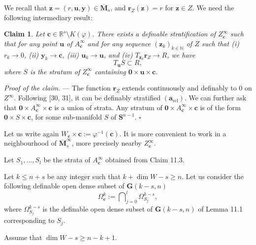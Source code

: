 \documentclass[11pt]{article}
\newtheorem{claim}{Claim}
\begin{document}
We recall that $\mathbf z = (r,\mathbf u,\mathbf y)\in\overline{\mathbf M}_s$, and
$\mathbf r_Z(\mathbf z) = r$ for $\mathbf z\in Z$. We need the following intermediary result:

\begin{claim}
Let $\mathbf c\in\mathbb{R}^s\setminus K(\varphi)$. There exists a definable stratification of
$Z_{\mathbf c}^{\infty}$ such that for any point $\mathbf u$ of $A_{\mathbf c}^{\infty}$ and for any
sequence $(\mathbf z_k)_{k\in\mathbb N}$ of $Z$ such that (i) $r_k\to 0$, (ii) $\mathbf y_k\to\mathbf c$,
(iii) $\mathbf u_k\to\mathbf u$, and (iv) $T_{\mathbf z_k}\mathbf r_Z\to R$, we have
\[
T_{\mathbf u}S\subset R,
\]
where $S$ is the stratum of $Z_{\mathbf c}^{\infty}$ containing $\mathbf 0\times\mathbf u\times\mathbf c$.
\end{claim}

\noindent\emph{Proof of the claim.} --- The function $\mathbf r_Z$ extends continuously and definably to
$0$ on $Z^{\infty}$. Following [30, 31], it can be definably stratified $(\mathbf a_{\mathrm{rel}})$.
We can further ask that $\mathbf 0\times A_{\mathbf c}^{\infty}\times\mathbf c$ is a union of strata.
Any stratum of $\mathbf 0\times A_{\mathbf c}^{\infty}\times\mathbf c$ is of the form
$\mathbf 0\times S\times\mathbf c$, for some sub-manifold $S$ of $\mathbf S^{n-1}$.
\hfill$\square$

Let us write again $W_{\mathbf c}\times\mathbf c := \varphi^{-1}(\mathbf c)$. It is more convenient to
work in a neighbourhood of $\overline{\mathbf M}_s^{\infty}$, more precisely nearby
$Z_{\mathbf c}^{\infty}$.

Let $S_1,\dots,S_l$ be the strata of $A_{\mathbf c}^{\infty}$ obtained from Claim 11.3.

Let $k\leqslant n+s$ be any integer such that $k+\dim W-s\geqslant n$. Let us consider the following
definable open dense subset of $\mathbf G(k-s,n)$
\[
\Omega_{\mathbf c}^k := \bigcap\nolimits_{j=0}^{l}\Omega_{S_j}^{k-s},
\]
where $\Omega_{S_j}^{k-s}$ is the definable open dense subset of $\mathbf G(k-s,n)$ of Lemma 11.1
corresponding to $S_j$.

Assume that $\dim W-s\geqslant n-k+1$.
\end{document}
